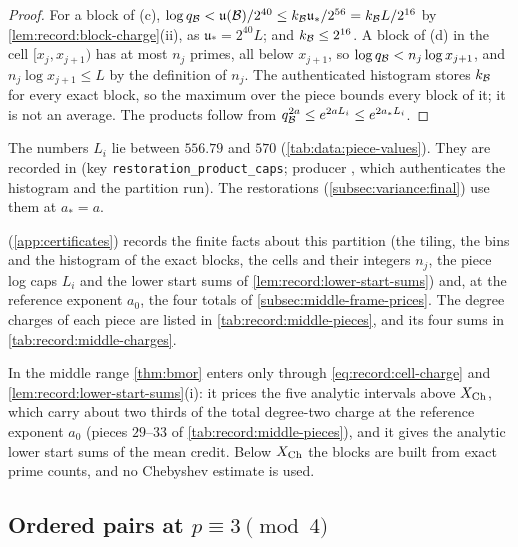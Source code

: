 \begin{proof}
For a block of (c), $\log q_{\mathcal B}<\mathfrak u(\mathcal B)/2^{40}\le
k_{\mathcal B}\mathfrak u_*/2^{56}=k_{\mathcal B}L/2^{16}$ by
\cref{lem:record:block-charge}(ii), as $\mathfrak u_*=2^{40}L$; and
$k_{\mathcal B}\le2^{16}$. A block of (d) in the cell $[x_j,x_{j+1})$ has at most
$n_j$ primes, all below $x_{j+1}$, so $\log q_{\mathcal B}<n_j\log x_{j+1}$, and
$n_j\log x_{j+1}\le L$ by the definition of $n_j$. The authenticated histogram
stores $k_{\mathcal B}$ for every exact block, so the maximum over the piece bounds
every block of it; it is not an average. The products follow from
$q_{\mathcal B}^{2a}\le e^{2aL_i}\le e^{2a_*L_i}$.
\end{proof}

The numbers $L_i$ lie between $556.79$ and $570$
(\cref{tab:data:piece-values}). They are recorded in
 (key
\texttt{restoration\_product\_caps}; producer
, which
authenticates the histogram and the partition run). The restorations
(\cref{subsec:variance:final}) use them at $a_*=a$.

 (\cref{app:certificates}) records the finite facts about
this partition (the tiling, the bins and the histogram of the exact blocks, the
cells and their integers $n_j$, the piece log caps $L_i$ and the lower start
sums of \cref{lem:record:lower-start-sums}) and, at the reference exponent
$a_0$, the four totals of \cref{subsec:middle-frame-prices}. The degree charges
of each piece are listed in \cref{tab:record:middle-pieces}, and its four sums
in \cref{tab:record:middle-charges}.

\begin{remark}
\label{rem:record:middle-scope}
In the middle range \cref{thm:bmor} enters only through
\eqref{eq:record:cell-charge} and \cref{lem:record:lower-start-sums}(i): it
prices the five analytic intervals above $X_{\rm Ch}$, which carry about
two thirds of the total degree-two charge at the reference exponent $a_0$
(pieces $29$--$33$ of \cref{tab:record:middle-pieces}), and it gives the
analytic lower start sums of the mean credit. Below $X_{\rm Ch}$ the blocks
are built from exact prime counts, and no Chebyshev estimate is used.
\end{remark}

\subsection{Ordered pairs at \texorpdfstring{$p\equiv3\pmod4$}{p = 3 (mod 4)}}\label{subsec:middle-pairs}

